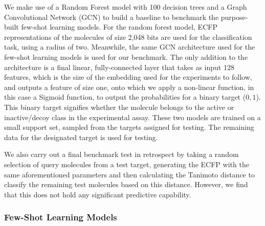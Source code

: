 We make use of a Random Forest model with 100 decision trees and a Graph Convolutional Network (GCN) to build a baseline to benchmark the purpose-built few-shot learning models. For the random forest model, ECFP representations of the molecules of size 2,048 bits are used for the classification task, using a radius of two. Meanwhile, the same GCN architecture used for the few-shot learning models is used for our benchmark. The only addition to the architecture is a final linear, fully-connected layer that takes as input 128 features, which is the size of the embedding used for the experiments to follow, and outputs a feature of size one, onto which we apply a non-linear function, in this case a Sigmoid function, to output the probabilities for a binary target (${0, 1}$). This binary target signifies whether the molecule belongs to the active or inactive/decoy class in the experimental assay. These two models are trained on a small support set, sampled from the targets assigned for testing. The remaining data for the designated target is used for testing.

We also carry out a final benchmark test in retrospect by taking a random selection of query molecules from a test target, generating the ECFP with the same aforementioned parameters and then calculating the Tanimoto distance to classify the remaining test molecules based on this distance. However, we find that this does not hold any significant predictive capability. 

\subsubsection{Few-Shot Learning Models}


